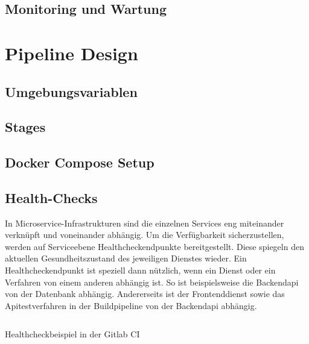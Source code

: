 \subsection{Monitoring und Wartung}
\label{subsec:monitoringundwartung}

\section{Pipeline Design}
\label{sec:pipelinedesign}

\subsection{Umgebungsvariablen}
\label{subsec:umgebungsvariablen}

\subsection{Stages}
\label{subsec:stages}


\subsection{Docker Compose Setup}
\label{subsec:dockercomposesetup}

\subsection{Health-Checks}
\label{subsec:healthcheck}
In Microservice-Infrastrukturen sind die einzelnen Services eng miteinander verknüpft
und voneinander abhängig. Um die Verfügbarkeit sicherzustellen, werden auf
Serviceebene Healthcheckendpunkte bereitgestellt. Diese spiegeln den aktuellen
Gesundheitszustand des jeweiligen Dienstes wieder. Ein Healthcheckendpunkt
ist speziell dann nützlich, wenn ein Dienst oder ein Verfahren von einem anderen
abhängig ist. So ist beispielsweise die Backendapi von der Datenbank
abhängig. Andererseits ist der Frontenddienst sowie das Apitestverfahren
in der Buildpipeline von der Backendapi abhängig. 

\begin{listing}
    \label{lst:healthcheck}
    \inputminted{sh}{snippets/sh/healthcheck.sh}
    \caption{Healthcheckbeispiel in der Gitlab CI}
\end{listing}

